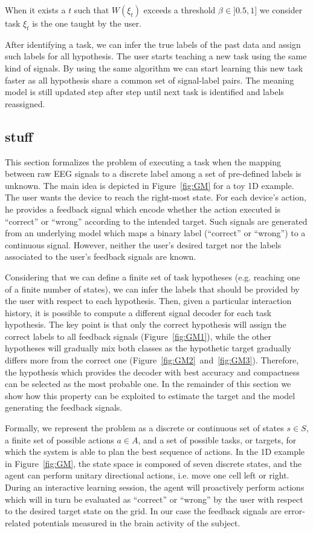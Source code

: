 When it exists a $t$ such that $W(\xi_t)$ exceeds a threshold $\beta \in ]0.5,1]$ we consider task $\xi_t$ is the one taught by the user.

After identifying a task, we can infer the true labels of the past data and assign such labels for all hypothesis. The user starts teaching a new task using the same kind of signals. By using the same algorithm we can start learning this new task faster as all hypothesis share a common set of signal-label pairs. The meaning model is still updated step after step until next task is identified and labels reassigned.

\subsection{stuff}


This section formalizes the problem of executing a task when the mapping between raw EEG signals to a discrete label among a set of pre-defined labels is unknown. The main idea is depicted in Figure~\ref{fig:GM} for a toy 1D example. The user wants the device to reach the right-most state. For each device's action, he provides a feedback signal which encode whether the action executed is ``correct'' or ``wrong'' according to the intended target. Such signals are generated from an underlying model which maps a binary label (``correct'' or ``wrong'') to a continuous signal. However, neither the user's desired target nor the labels associated to the user's feedback signals are known.

Considering that we can define a finite set of task hypotheses (e.g. reaching one of a finite number of states), we can infer the labels that should be provided by the user with respect to each hypothesis. Then, given a particular interaction history, it is possible to compute a different signal decoder for each task hypothesis. The key point is that only the correct hypothesis will assign the correct labels to all feedback signals (Figure~\ref{fig:GM1}), while the other hypotheses will gradually mix both classes as the hypothetic target gradually differs more from the correct one (Figure~\ref{fig:GM2}~and~\ref{fig:GM3}). Therefore, the hypothesis which provides the decoder with best accuracy and compactness can be selected as the most probable one. In the remainder of this section we show how this property can be exploited to estimate the target and the model generating the feedback signals.

Formally, we represent the problem as a discrete or continuous set of states $s \in S$,  a finite set of possible actions $a \in A$, and a set of possible tasks, or targets, for which the system is able to plan the best sequence of actions. In the 1D example in Figure~\ref{fig:GM}, the state space is composed of seven discrete states, and the agent can perform unitary directional actions, i.e. move one cell left or right. During an interactive learning session, the agent will proactively perform actions which will in turn be evaluated as ``correct'' or ``wrong'' by the user with respect to the desired target state on the grid. In our case the feedback signals are error-related potentials measured in the brain activity of the subject.

